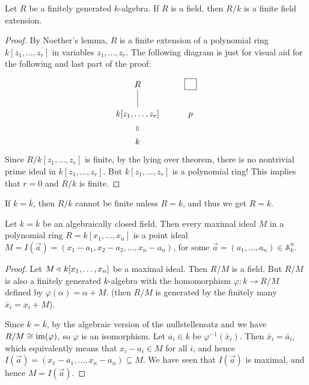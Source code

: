 \documentclass[11pt,a4paper]{article}
\newcommand{\A}{\mathbb A}
\begin{document}
\begin{corollary}
  \label{cor:algebraic-version-of-the-weak-null}
  Let $R$ be a finitely generated $k$-algebra.
  If $R$ is a field, then $R/k$ is a finite field extension.
\end{corollary}
\begin{proof}
  By Noether's lemma, $R$ is a finite extension of a polynomial
  ring $k[z_1,\dots,z_r]$ in variables $z_1,\dots,z_r$.
  The following diagram is just for visual aid for the following
  and last part of the proof:

  \[\begin{tikzcd}[ampersand replacement=\&,cramped]
    R \& {\boxed{\phantom{R}}} \\
    {k[z_1,\dots,z_r]} \& p \\
    k
    \arrow[no head, from=2-1, to=1-1]
    \arrow["{\rotatebox{90}{=}}", draw=none, shift right=2, from=3-1, to=2-1]
  \end{tikzcd}\]

  Since $R/k[z_1,\dots,z_r]$ is finite,
  by the lying over theorem, there is no nontrivial
  prime ideal in $k[z_1,\dots,z_r]$.
  But $k[z_1,\dots,z_r]$ is a polynomial ring!
  This implies that $r = 0$ and $R/k$ is finite.
\end{proof}

\begin{remark}
  \label{rem:null}
  If $k = \overline k$, then $R/k$ cannot be finite
  unless $R = k$, and thus we get $R = k$.
\end{remark}

\begin{corollary}
  Let $k = \overline k$ be an algebraically closed field.
  Then every maximal ideal $M$ in a polynomial ring $R = k[x_1,\dots,x_n]$
  is a point ideal $M = I(\vec a) = (x_1 - a_1, x_2 - a_2, \dots, x_n - a_n)$,
  for some $\vec a = (a_1,\dots,a_n) \in \A_k^n$.
\end{corollary}
\begin{proof}
  Let $M \triangleleft\, k[x_1,\dots,x_n]$ be a maximal ideal.
  Then $R/M$ is a field.
  But $R/M$ is also a finitely generated $k$-algebra
  with the homomorphism $\varphi \colon k \to R/M$
  defined by $\varphi(\alpha) = \alpha + M$.
  (then $R/M$ is generated by the finitely many $\bar x_i = x_i + M$).

  Since $k = \overline k$, by the algebraic version of the nullstellensatz
  and  we have $R/M \cong \operatorname{im}(\varphi)$,
  so $\varphi$ is an isomorphism.
  Let $a_i \in k$ be $\varphi^{-1}(\bar x_i)$.
  Then $\bar x_i = \bar a_i$, which equivalently means that $x_i - a_i \in M$
  for all $i$,
  and hence $I(\vec a) = (x_1 - a_1, \dots, x_n - a_n) \subseteq M$.
  We have seen that $I(\vec a)$ is maximal, and hence $M = I(\vec a)$.
\end{proof}
\end{document}
